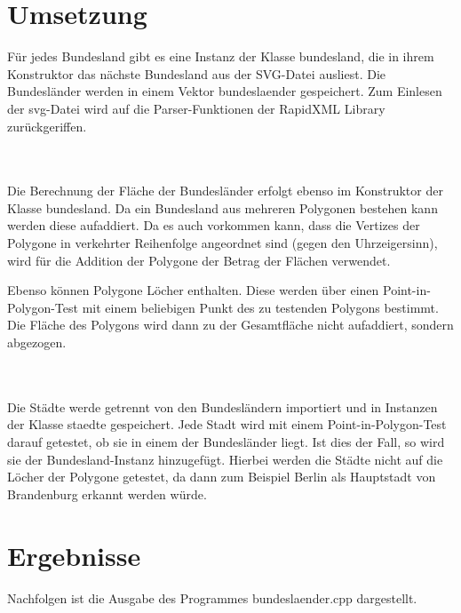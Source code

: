 \documentclass[12pt]{scrartcl}
\begin{document}
\section{Umsetzung}

Für jedes Bundesland gibt es eine Instanz der Klasse bundesland, die in ihrem Konstruktor das nächste Bundesland aus der SVG-Datei ausliest.
Die Bundesländer werden in einem Vektor bundeslaender gespeichert.
Zum Einlesen der svg-Datei wird auf die Parser-Funktionen der RapidXML Library zurückgeriffen.

\ \\~\\

Die Berechnung der Fläche der Bundesländer erfolgt ebenso im Konstruktor der Klasse bundesland.
Da ein Bundesland aus mehreren Polygonen bestehen kann werden diese aufaddiert.
Da es auch vorkommen kann, dass die Vertizes der Polygone in verkehrter Reihenfolge angeordnet sind (gegen den Uhrzeigersinn), wird für die Addition der Polygone der Betrag der Flächen verwendet.

Ebenso können Polygone Löcher enthalten. Diese werden über einen Point-in-Polygon-Test mit einem beliebigen Punkt des zu testenden Polygons bestimmt.
Die Fläche des Polygons wird dann zu der Gesamtfläche nicht aufaddiert, sondern abgezogen.

\ \\~\\

Die Städte werde getrennt von den Bundesländern importiert und in Instanzen der Klasse staedte gespeichert.
Jede Stadt wird mit einem Point-in-Polygon-Test darauf getestet, ob sie in einem der Bundesländer liegt.
Ist dies der Fall, so wird sie der Bundesland-Instanz hinzugefügt.
Hierbei werden die Städte nicht auf die Löcher der Polygone getestet, da dann zum Beispiel Berlin als Hauptstadt von Brandenburg erkannt werden würde.

\section{Ergebnisse}
Nachfolgen ist die Ausgabe des Programmes bundeslaender.cpp dargestellt.
\end{document}
